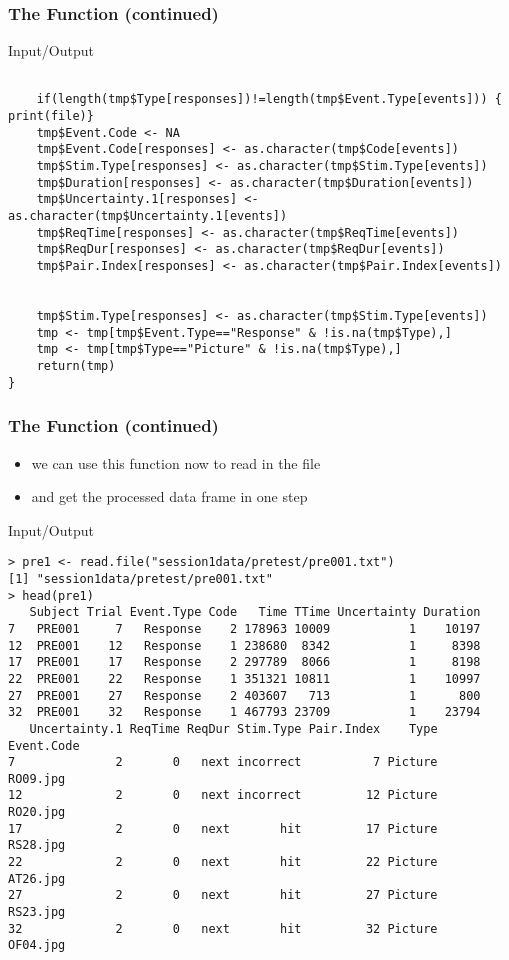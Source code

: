 \documentclass[xcolor={table},c]{beamer}
\begin{document}
\begin{frame}[fragile]\frametitle{The Function (continued)}
  \begin{exampleblock}{Input/Output}\scriptsize
\begin{verbatim}

    if(length(tmp$Type[responses])!=length(tmp$Event.Type[events])) { print(file)}
    tmp$Event.Code <- NA
    tmp$Event.Code[responses] <- as.character(tmp$Code[events])
    tmp$Stim.Type[responses] <- as.character(tmp$Stim.Type[events])
    tmp$Duration[responses] <- as.character(tmp$Duration[events])
    tmp$Uncertainty.1[responses] <- as.character(tmp$Uncertainty.1[events])
    tmp$ReqTime[responses] <- as.character(tmp$ReqTime[events])
    tmp$ReqDur[responses] <- as.character(tmp$ReqDur[events])
    tmp$Pair.Index[responses] <- as.character(tmp$Pair.Index[events])


    tmp$Stim.Type[responses] <- as.character(tmp$Stim.Type[events])
    tmp <- tmp[tmp$Event.Type=="Response" & !is.na(tmp$Type),]
    tmp <- tmp[tmp$Type=="Picture" & !is.na(tmp$Type),]
    return(tmp)
}
\end{verbatim}
  \end{exampleblock}
\end{frame}


\begin{frame}[fragile]\frametitle{The Function (continued)}
  \begin{itemize}
  \item we can use this function now to read in the file 
  \item and get the processed data frame in one step
  \end{itemize}
  \begin{exampleblock}{Input/Output}\tiny
\begin{verbatim}
> pre1 <- read.file("session1data/pretest/pre001.txt")
[1] "session1data/pretest/pre001.txt"
> head(pre1)
   Subject Trial Event.Type Code   Time TTime Uncertainty Duration
7   PRE001     7   Response    2 178963 10009           1    10197
12  PRE001    12   Response    1 238680  8342           1     8398
17  PRE001    17   Response    2 297789  8066           1     8198
22  PRE001    22   Response    1 351321 10811           1    10997
27  PRE001    27   Response    2 403607   713           1      800
32  PRE001    32   Response    1 467793 23709           1    23794
   Uncertainty.1 ReqTime ReqDur Stim.Type Pair.Index    Type Event.Code
7              2       0   next incorrect          7 Picture   RO09.jpg
12             2       0   next incorrect         12 Picture   RO20.jpg
17             2       0   next       hit         17 Picture   RS28.jpg
22             2       0   next       hit         22 Picture   AT26.jpg
27             2       0   next       hit         27 Picture   RS23.jpg
32             2       0   next       hit         32 Picture   OF04.jpg

\end{verbatim}
  \end{exampleblock}
\end{frame}
\end{document}
